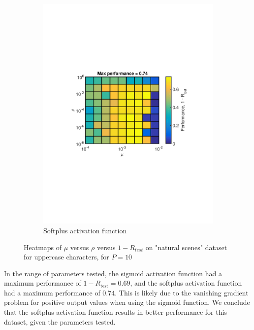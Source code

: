 \documentclass[journal,a4paper,onecolumn,11pt]{IEEEtran}
\begin{document}
\begin{figure}[!h]
\begin{subfigure}{.5\textwidth}
        \includegraphics[width=1.05\textwidth]{Opt_sp_ucchar.pdf}
  \caption{Softplus activation function}
  \label{fig:Opt_sp_ucchar}
\end{subfigure}
\caption{Heatmaps of $\mu$ versus $\rho$ versus $1-R_{test}$ on "natural scenes" dataset for uppercase characters, for $P=10$}
    \label{fig:Sigmoid_softplus}
\end{figure}
In the range of parameters tested, the sigmoid activation function had a maximum performance of $1-R_{\text{test}}=0.69$, and the softplus activation function had a maximum performance of $0.74$. This is likely due to the vanishing gradient problem for positive output values when using the sigmoid function. We conclude that the softplus activation function results in better performance for this dataset, given the parameters tested.
\end{document}
